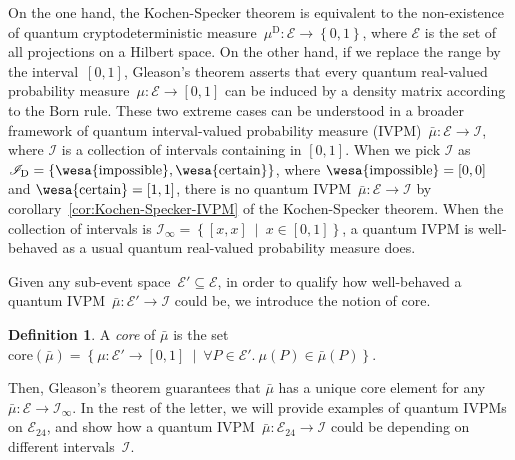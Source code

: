 \documentclass[reprint, aps, prl,superscriptaddress, showpacs,
showkeys]{revtex4-1}
\theoremstyle{plain}
\theoremstyle{definition}
\newtheorem{definition}[thm]{Definition}
\newcommand{\events}{\ensuremath{\mathcal{E}}}
\newcommand{\pmeas}{\ensuremath{\mu}}
\newcommand{\imposs}{{\mbox{\wesa{impossible}}}}
\newcommand{\necess}{{\mbox{\wesa{certain}}}}
\newcommand{\set}[2]{\ensuremath{\left\{ {#1}~\middle|~{#2}\right\} }}
\begin{document}
On the one hand, the Kochen-Specker theorem is equivalent to the non-existence
of quantum cryptodeterministic measure~$\mu^{\mathrm{D}}:\events\rightarrow\left\{ 0,1\right\} $,
where $\events$ is the set of all projections on a Hilbert space.
On the other hand, if we replace the range by the interval~$\left[0,1\right]$,
Gleason's theorem asserts that every quantum real-valued probability
measure~$\mu:\events\rightarrow\left[0,1\right]$ can be induced
by a density matrix according to the Born rule. These two extreme
cases can be understood in a broader framework of quantum interval-valued
probability measure (IVPM)~$\bar{\mu}:\events\rightarrow\mathscr{I}$,
where $\mathscr{I}$ is a collection of intervals containing in $\left[0,1\right]$.
When we pick $\mathscr{I}$ as $\mathscr{I}_{\mathrm{D}}=\left\{ \imposs,\necess\right\} $,
where $\imposs=\left[0,0\right]$ and $\necess=\left[1,1\right]$,
there is no quantum IVPM~$\bar{\mu}:\events\rightarrow\mathscr{I}$
by corollary~\ref{cor:Kochen-Specker-IVPM} of the Kochen-Specker
theorem. When the collection of intervals is $\mathscr{I}_{\infty}=\set{\left[x,x\right]}{x\in\left[0,1\right]}$,
a quantum IVPM is well-behaved as a usual quantum real-valued probability
measure does. 

Given any sub-event space~$\events'\subseteq\events$, in order to
qualify how well-behaved a quantum IVPM~$\bar{\mu}:\events'\rightarrow\mathscr{I}$
could be, we introduce the notion of core.

\begin{definition}A \emph{core} of $\bar{\mu}$ is the set $\mathrm{core}\left(\bar{\mu}\right)=\set{\pmeas:\events'\rightarrow[0,1]}{\forall P\in\events'.~\pmeas\left(P\right)\in\bar{\mu}\left(P\right)}$.\end{definition}

\noindent Then, Gleason's theorem guarantees that $\bar{\mu}$ has
a unique core element for any $\bar{\mu}:\events\rightarrow\mathscr{I}_{\infty}$.
In the rest of the letter, we will provide examples of quantum IVPMs
on $\events_{24}$, and show how a quantum IVPM~$\bar{\mu}:\events_{24}\rightarrow\mathscr{I}$
could be depending on different intervals~$\mathscr{I}$.
\end{document}
